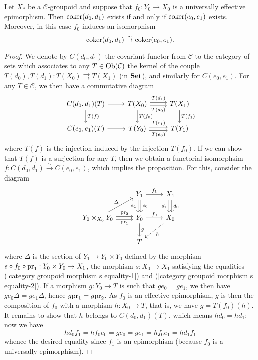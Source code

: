 \begin{proposition}\label{category groupoid cokernel under universal effective base change prop}
Let $X_*$ be a $\mathcal{C}$-groupoid and suppose that $f_0:Y_0\to X_0$ is a universally effective epimorphism. Then $\operatorname{coker}(d_0,d_1)$ exists if and only if $\operatorname{coker}(e_0,e_1)$ exists. Moreover, in this case $f_0$ induces an isomorphism
\[\operatorname{coker}(d_0,d_1)\stackrel{\sim}{\to}\operatorname{coker}(e_0,e_1).\]
\end{proposition}
\begin{proof}
We denote by $C(d_0,d_1)$ the covariant functor from $\mathcal{C}$ to the category of sets which associates to any $T\in\mathrm{Ob}(\mathcal{C})$ the kernel of the couple $T(d_0),T(d_1):T(X_0)\rightrightarrows T(X_1)$ (in $\mathbf{Set}$), and similarly for $C(e_0,e_1)$. For any $T\in\mathcal{C}$, we then have a commutative diagram
\[\begin{tikzcd}
C(d_0,d_1)(T)\ar[r]\ar[d,"T(f)"]&T(X_0)\ar[r,shift left,"T(d_1)"]\ar[r,shift right,swap,"T(d_0)"]\ar[d,"T(f_0)"]&T(X_1)\ar[d,"T(f_1)"]\\
C(e_0,e_1)(T)\ar[r]&T(Y_0)\ar[r,shift left,"T(e_1)"]\ar[r,shift right,swap,"T(e_0)"]&T(Y_1)
\end{tikzcd}\]
where $T(f)$ is the injection induced by the injection $T(f_0)$. If we can show that $T(f)$ is a surjection for any $T$, then we obtain a functorial isomorphsim $f:C(d_0,d_1)\stackrel{\sim}{\to}C(e_0,e_1)$, which implies the proposition. For this, consider the diagram
\[\begin{tikzcd}
&Y_1\ar[r,"f_1"]\ar[d,shift left=2pt,"e_0"]\ar[d,shift right=2pt,swap,"e_1"]&X_1\ar[d,shift left=2pt,"d_0"]\ar[d,shift right=2pt,swap,"d_1"]\\
Y_0\times_{X_0}Y_0\ar[ru,"\Delta"]\ar[r,shift left=2pt,"\pr_2"]\ar[r,shift right=2pt,swap,"\pr_1"]&Y_0\ar[d,"g"]\ar[r,"f_0"]&X_0\ar[ld,dashed,"h"]\\
&T&
\end{tikzcd}\]
where $\Delta$ is the section of $Y_1\to Y_0\times Y_0$ defined by the morphism $s\circ f_0\circ\mathrm{pr}_1:Y_0\times Y_0\to X_1$, the morphism $s:X_0\to X_1$ satisfying the equalities (\ref{category groupoid morphism s equality-1}) and (\ref{category groupoid morphism s equality-2}). If a morphism $g:Y_0\to T$ is such that $ge_0=ge_1$, we then have $ge_0\Delta=ge_1\Delta$, hence $g\mathrm{pr}_1=g\mathrm{pr}_2$. As $f_0$ is an effective epimorphism, $g$ is then the composition of $f_0$ with a morphism $h:X_0\to T$, that is, we have $g=T(f_0)(h)$. It remains to show that $h$ belongs to $C(d_0,d_1)(T)$, which means $hd_0=hd_1$; now we have
\[hd_0f_1=hf_0e_0=ge_0=ge_1=hf_0e_1=hd_1f_1\]
whence the desired equality since $f_1$ is an epimorphism (because $f_0$ is a universally epimorphism).
\end{proof}


